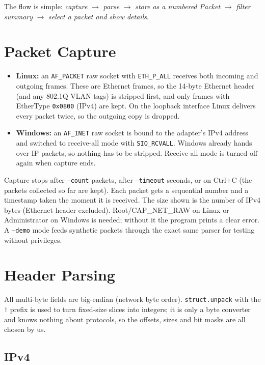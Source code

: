 \documentclass[11pt,a4paper]{article}
\begin{document}
The flow is simple: \emph{capture} $\rightarrow$ \emph{parse} $\rightarrow$
\emph{store as a numbered Packet} $\rightarrow$ \emph{filter summary}
$\rightarrow$ \emph{select a packet and show details}.

\section{Packet Capture}

\begin{itemize}
  \item \textbf{Linux:} an \texttt{AF\_PACKET} raw socket with
  \texttt{ETH\_P\_ALL} receives both incoming and outgoing frames. These are
  Ethernet frames, so the 14-byte Ethernet header (and any 802.1Q VLAN tags)
  is stripped first, and only frames with EtherType \texttt{0x0800} (IPv4) are
  kept. On the loopback interface Linux delivers every packet twice, so the
  outgoing copy is dropped.
  \item \textbf{Windows:} an \texttt{AF\_INET} raw socket is bound to the
  adapter's IPv4 address and switched to receive-all mode with
  \texttt{SIO\_RCVALL}. Windows already hands over IP packets, so nothing has
  to be stripped. Receive-all mode is turned off again when capture ends.
\end{itemize}

Capture stops after \texttt{--count} packets, after \texttt{--timeout}
seconds, or on Ctrl+C (the packets collected so far are kept). Each packet gets
a sequential number and a timestamp taken the moment it is received. The size
shown is the number of IPv4 bytes (Ethernet header excluded). Root/CAP\_NET\_RAW
on Linux or Administrator on Windows is needed; without it the program prints a
clear error. A \texttt{--demo} mode feeds synthetic packets through the exact
same parser for testing without privileges.

\section{Header Parsing}

All multi-byte fields are big-endian (network byte order).
\texttt{struct.unpack} with the \texttt{!} prefix is used to turn fixed-size
slices into integers; it is only a byte converter and knows nothing about
protocols, so the offsets, sizes and bit masks are all chosen by us.

\subsection{IPv4}
\end{document}
